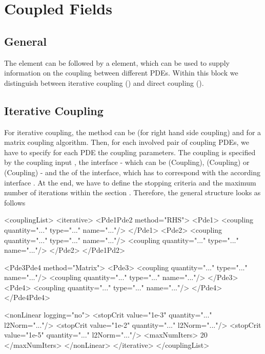 %
%
\chapter{Coupled Fields}
%
%
\section{General}
The  element can be followed by a  element,
which can be used to supply information on the coupling between different
PDEs. Within this block we distinguish between iterative coupling
() and direct coupling ().
%
%
\section{Iterative Coupling}
 For iterative coupling,
the method can be  (for right hand side coupling) and 
for
a matrix coupling algorithm.
Then, for each involved pair of coupling PDEs, we have
to specify for each PDE the coupling parameters. 
The coupling is specified by the coupling input , the
interface  - which can be (Coupling),
(Coupling) or (Coupling) -  and the 
of
the interface, which has to correspond with the according interface
. At the end, we have to define
the stopping criteria and the maximum number of iterations
within the section . Therefore, the general structure 
looks as follows


\begin{xmllisting}
<couplingList>
  <iterative>
    <Pde1Pde2 method="RHS">
      <Pde1>
        <coupling quantity="..." type="..." name="..."/>
      </Pde1>
      <Pde2>
        <coupling quantity="..." type="..." name="..."/>
        <coupling quantity="..." type="..." name="..."/>
      </Pde2>
    </Pde1Pd2>

    <Pde3Pde4 method="Matrix">
      <Pde3>
        <coupling quantity="..." type="..." name="..."/>
        <coupling quantity="..." type="..." name="..."/>
      </Pde3>
      <Pde4>
        <coupling quantity="..." type="..." name="..."/>
      </Pde4>
    </Pde4Pde4>

    <nonLinear logging="no">
      <stopCrit value="1e-3" quantity="..." l2Norm="..."/>
      <stopCrit value="1e-2" quantity="..." l2Norm="..."/>
      <stopCrit value="1e-5" quantity="..." l2Norm="..."/>
      <maxNumIters> 20 </maxNumIters>
    </nonLinear>
  </iterative>
</couplingList>
\end{xmllisting}

